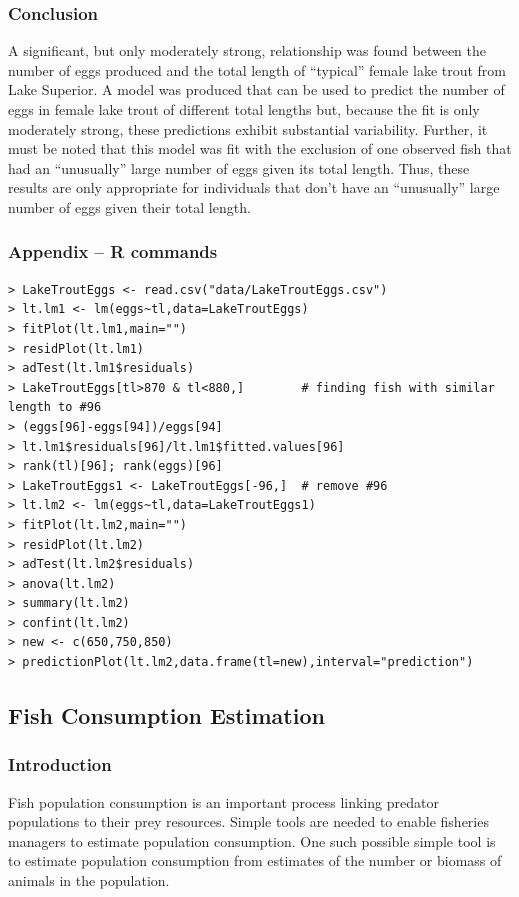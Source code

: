 \documentclass[10pt,openany]{book}\usepackage[]{graphicx}\usepackage[]{color}
\begin{document}
\subsubsection*{Conclusion}
A significant, but only moderately strong, relationship was found between the number of eggs produced and the total length of ``typical'' female lake trout from Lake Superior.  A model was produced that can be used to predict the number of eggs in female lake trout of different total lengths but, because the fit is only moderately strong, these predictions exhibit substantial variability.  Further, it must be noted that this model was fit with the exclusion of one observed fish that had an ``unusually'' large number of eggs given its total length.  Thus, these results are only appropriate for individuals that don't have an ``unusually'' large number of eggs given their total length.

\subsubsection*{Appendix -- R commands}
\begin{Verbatim}[formatcom=\color{red},xleftmargin=5mm,commandchars=\\\{\}]
> LakeTroutEggs <- read.csv("data/LakeTroutEggs.csv")
> lt.lm1 <- lm(eggs~tl,data=LakeTroutEggs)
> fitPlot(lt.lm1,main="")
> residPlot(lt.lm1)
> adTest(lt.lm1$residuals)
> LakeTroutEggs[tl>870 & tl<880,]        # finding fish with similar length to #96
> (eggs[96]-eggs[94])/eggs[94]
> lt.lm1$residuals[96]/lt.lm1$fitted.values[96]
> rank(tl)[96]; rank(eggs)[96]
> LakeTroutEggs1 <- LakeTroutEggs[-96,]  # remove #96
> lt.lm2 <- lm(eggs~tl,data=LakeTroutEggs1)
> fitPlot(lt.lm2,main="")
> residPlot(lt.lm2)
> adTest(lt.lm2$residuals)
> anova(lt.lm2)
> summary(lt.lm2)
> confint(lt.lm2)
> new <- c(650,750,850)
> predictionPlot(lt.lm2,data.frame(tl=new),interval="prediction")
\end{Verbatim}


\subsection{Fish Consumption Estimation}
\subsubsection*{Introduction}

Fish population consumption is an important process linking predator populations to their prey resources.  Simple tools are needed to enable fisheries managers to estimate population consumption.  One such possible simple tool is to estimate population consumption from estimates of the number or biomass of animals in the population.
\end{document}
